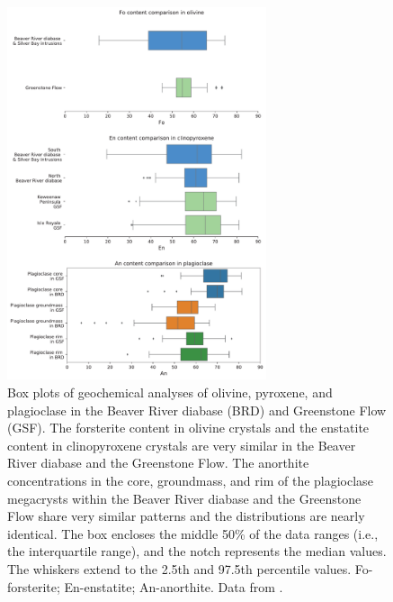  \begin{figure}[h!]
\centering
\noindent\includegraphics[width=0.68\textwidth]{figure/Zhang2021/Geochem.pdf}
\caption[Box plots of geochemical analyses of olivine, pyroxene, and plagioclase in the Beaver River diabase (BRD) and Greenstone Flow (GSF).]{\footnotesize{Box plots of geochemical analyses of olivine, pyroxene, and plagioclase in the Beaver River diabase (BRD) and Greenstone Flow (GSF). The forsterite content in olivine crystals and the enstatite content in clinopyroxene crystals are very similar in the Beaver River diabase and the Greenstone Flow. The anorthite concentrations in the core, groundmass, and rim of the plagioclase megacrysts within the Beaver River diabase and the Greenstone Flow share very similar patterns and the distributions are nearly identical. The box encloses the middle 50\% of the data ranges (i.e., the interquartile range), and the notch represents the median values. The whiskers extend to the 2.5th and 97.5th percentile values. Fo-forsterite; En-enstatite; An-anorthite. Data from \cite{Doyle2016a}.}}
\label{fig:Geochem}
\end{figure}

